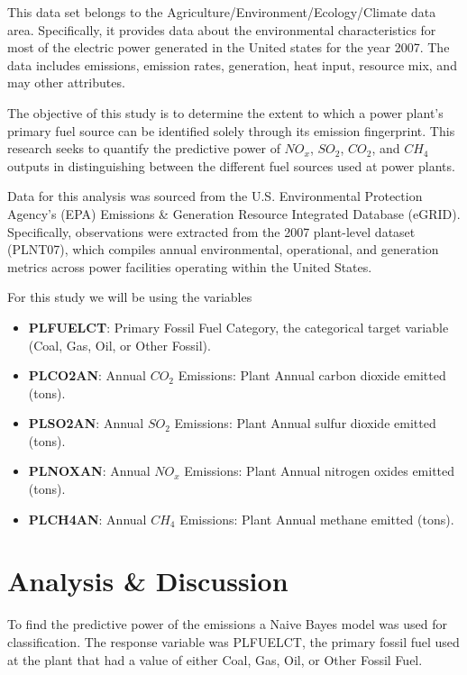 \documentclass[
]{article}
\providecommand{\tightlist}{%
  \setlength{\itemsep}{0pt}\setlength{\parskip}{0pt}}
\begin{document}
This data set belongs to the Agriculture/Environment/Ecology/Climate
data area. Specifically, it provides data about the environmental
characteristics for most of the electric power generated in the United
states for the year 2007. The data includes emissions, emission rates,
generation, heat input, resource mix, and may other attributes.

The objective of this study is to determine the extent to which a power
plant's primary fuel source can be identified solely through its
emission fingerprint. This research seeks to quantify the predictive
power of \(NO_x\), \(SO_2\), \(CO_2\), and \(CH_4\) outputs in
distinguishing between the different fuel sources used at power plants.

Data for this analysis was sourced from the U.S. Environmental
Protection Agency's (EPA) Emissions \& Generation Resource Integrated
Database (eGRID). Specifically, observations were extracted from the
2007 plant-level dataset (PLNT07), which compiles annual environmental,
operational, and generation metrics across power facilities operating
within the United States.

For this study we will be using the variables

\begin{itemize}
\tightlist
\item
  \textbf{PLFUELCT}: Primary Fossil Fuel Category, the categorical
  target variable (Coal, Gas, Oil, or Other Fossil).
\item
  \textbf{PLCO2AN}: Annual \(CO_2\) Emissions: Plant Annual carbon
  dioxide emitted (tons).
\item
  \textbf{PLSO2AN}: Annual \(SO_2\) Emissions: Plant Annual sulfur
  dioxide emitted (tons).
\item
  \textbf{PLNOXAN}: Annual \(NO_x\) Emissions: Plant Annual nitrogen
  oxides emitted (tons).
\item
  \textbf{PLCH4AN}: Annual \(CH_4\) Emissions: Plant Annual methane
  emitted (tons).
\end{itemize}

\section{Analysis \& Discussion}\label{analysis-discussion}

To find the predictive power of the emissions a Naive Bayes model was
used for classification. The response variable was PLFUELCT, the primary
fossil fuel used at the plant that had a value of either Coal, Gas, Oil,
or Other Fossil Fuel.
\end{document}
